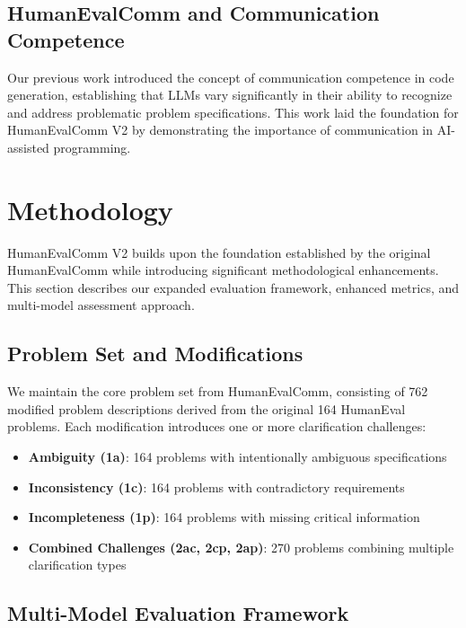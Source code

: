 \documentclass[conference]{IEEEtran}
\begin{document}
\subsection{HumanEvalComm and Communication Competence}

Our previous work \cite{wu2025humanevalcomm} introduced the concept of communication competence in code generation, establishing that LLMs vary significantly in their ability to recognize and address problematic problem specifications. This work laid the foundation for HumanEvalComm V2 by demonstrating the importance of communication in AI-assisted programming.

\section{Methodology}

HumanEvalComm V2 builds upon the foundation established by the original HumanEvalComm while introducing significant methodological enhancements. This section describes our expanded evaluation framework, enhanced metrics, and multi-model assessment approach.

\subsection{Problem Set and Modifications}

We maintain the core problem set from HumanEvalComm, consisting of 762 modified problem descriptions derived from the original 164 HumanEval problems. Each modification introduces one or more clarification challenges:

\begin{itemize}
    \item \textbf{Ambiguity (1a)}: 164 problems with intentionally ambiguous specifications
    \item \textbf{Inconsistency (1c)}: 164 problems with contradictory requirements
    \item \textbf{Incompleteness (1p)}: 164 problems with missing critical information
    \item \textbf{Combined Challenges (2ac, 2cp, 2ap)}: 270 problems combining multiple clarification types
\end{itemize}

\subsection{Multi-Model Evaluation Framework}
\end{document}
